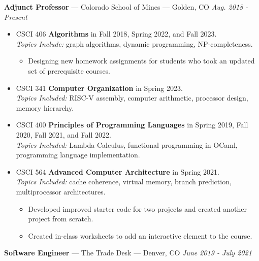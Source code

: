\documentclass[10pt,letterpaper]{article}
\begin{document}
{\fontsize{11}{0}
\textbf{Adjunct Professor} --- Colorado School of Mines --- Golden, CO}
\hfill \textit{Aug. 2018 - Present}
\begin{itemize}
    \item CSCI 406 \textbf{Algorithms} in Fall 2018, Spring 2022, and Fall 2023. \\
        \textit{Topics Include:} graph algorithms, dynamic programming,
        NP-completeness.
        \begin{itemize}[topsep=-2pt]
            \item Designing new homework assignments for students who took an
                updated set of prerequisite courses.
        \end{itemize}
    \item CSCI 341 \textbf{Computer Organization} in Spring 2023. \\
        \textit{Topics Included:} RISC-V assembly, computer arithmetic,
        processor design, memory hierarchy.
    \item CSCI 400 \textbf{Principles of Programming Languages} in Spring
        2019, Fall 2020, Fall 2021, and Fall 2022. \\
        \textit{Topics Included:} Lambda Calculus, functional programming in
        OCaml, programming language implementation.
    \item CSCI 564 \textbf{Advanced Computer Architecture} in Spring 2021. \\
        \textit{Topics Included:} cache coherence, virtual memory, branch
        prediction, multiprocessor architectures.
        \begin{itemize}[topsep=-2pt]
            \item Developed improved starter code for two projects and created
                another project from scratch.
            \item Created in-class worksheets to add an interactive element to
                the course.
        \end{itemize}
\end{itemize}

{\fontsize{11}{0}
\textbf{Software Engineer} --- The Trade Desk --- Denver, CO}
\hfill \textit{June 2019 - July 2021}
\end{document}

